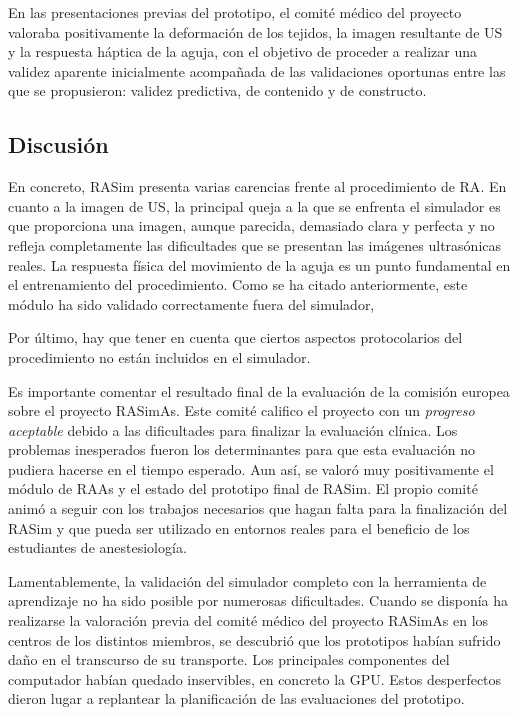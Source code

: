 En las presentaciones previas del prototipo, el comité médico del proyecto valoraba positivamente la deformación de los tejidos, la imagen resultante de \ac{US} y la respuesta háptica de la aguja, con el objetivo de proceder a realizar una validez aparente inicialmente acompañada de las validaciones oportunas entre las que se propusieron: validez predictiva, de contenido y de constructo.





\subsection{Discusión}


En concreto, \ac{RASim} presenta varias carencias frente al procedimiento de \ac{RA}. 
En cuanto a la imagen de \ac{US}, la principal queja a la que se enfrenta el simulador es que proporciona una imagen, aunque parecida, demasiado clara y perfecta y no refleja completamente las dificultades que se presentan las imágenes ultrasónicas reales.
La respuesta física del movimiento de la aguja es un punto fundamental en el entrenamiento del procedimiento. Como se ha citado anteriormente, este módulo ha sido validado correctamente fuera del simulador, 


Por último, hay que tener en cuenta que ciertos aspectos protocolarios del procedimiento no están incluidos en el simulador.

Es importante comentar el resultado final de la evaluación de la comisión europea sobre el proyecto \ac{RASimAs}. Este comité califico el proyecto con un \emph{progreso aceptable} debido a las dificultades para finalizar la evaluación clínica. Los problemas inesperados fueron los determinantes para que esta evaluación no pudiera hacerse en el tiempo esperado. Aun así, se valoró muy positivamente el módulo de \ac{RAAs} y el estado del prototipo final de \ac{RASim}. El propio comité animó a seguir con los trabajos necesarios que hagan falta para la finalización del \ac{RASim} y que pueda ser utilizado en entornos reales para el beneficio de los estudiantes de anestesiología.

Lamentablemente, la validación del simulador completo con la herramienta de aprendizaje no ha sido posible por numerosas dificultades.
Cuando se disponía ha realizarse la valoración previa del comité médico del proyecto \ac{RASimAs} en los centros de los distintos miembros, se descubrió que los prototipos habían sufrido daño en el transcurso de su transporte. Los principales componentes del computador habían quedado inservibles, en concreto la \ac{GPU}. Estos desperfectos dieron lugar a replantear la planificación de las evaluaciones del prototipo.

